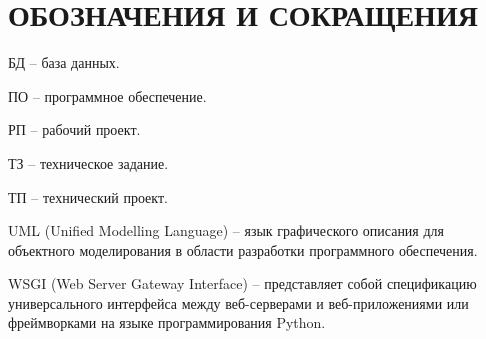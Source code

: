 \section*{ОБОЗНАЧЕНИЯ И СОКРАЩЕНИЯ}

БД -- база данных.

ПО -- программное обеспечение.

РП -- рабочий проект.

ТЗ -- техническое задание.

ТП -- технический проект.

UML (Unified Modelling Language) -- язык графического описания для объектного моделирования в области разработки программного обеспечения.

WSGI (Web Server Gateway Interface) -- представляет собой спецификацию универсального интерфейса между веб-серверами и веб-приложениями или фреймворками на языке программирования Python. 

